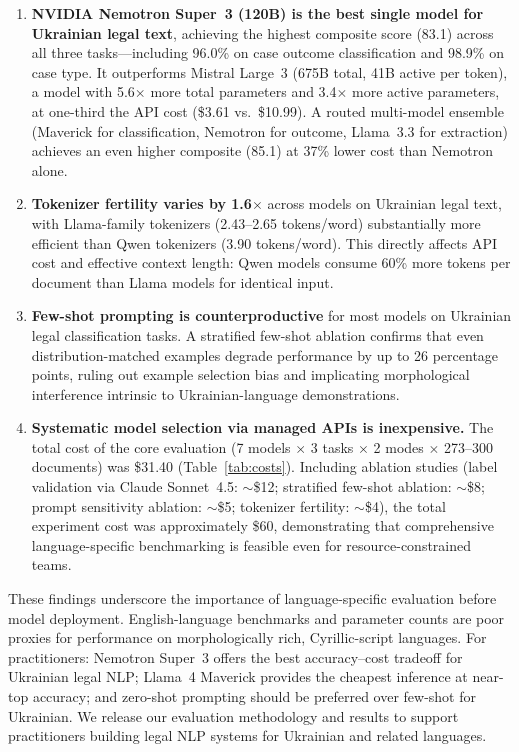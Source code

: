 \documentclass[11pt,a4paper]{article}
\begin{document}
\begin{enumerate}[leftmargin=*]
    \item \textbf{NVIDIA Nemotron Super~3 (120B) is the best single model for Ukrainian legal text}, achieving the highest composite score (83.1) across all three tasks---including 96.0\% on case outcome classification and 98.9\% on case type. It outperforms Mistral Large~3 (675B total, 41B active per token), a model with 5.6$\times$ more total parameters and 3.4$\times$ more active parameters, at one-third the API cost (\$3.61 vs.\ \$10.99). A routed multi-model ensemble (Maverick for classification, Nemotron for outcome, Llama~3.3 for extraction) achieves an even higher composite (85.1) at 37\% lower cost than Nemotron alone.

    \item \textbf{Tokenizer fertility varies by 1.6$\times$} across models on Ukrainian legal text, with Llama-family tokenizers (2.43--2.65 tokens/word) substantially more efficient than Qwen tokenizers (3.90 tokens/word). This directly affects API cost and effective context length: Qwen models consume 60\% more tokens per document than Llama models for identical input.

    \item \textbf{Few-shot prompting is counterproductive} for most models on Ukrainian legal classification tasks. A stratified few-shot ablation confirms that even distribution-matched examples degrade performance by up to 26 percentage points, ruling out example selection bias and implicating morphological interference intrinsic to Ukrainian-language demonstrations.

    \item \textbf{Systematic model selection via managed APIs is inexpensive.} The total cost of the core evaluation (7 models $\times$ 3 tasks $\times$ 2 modes $\times$ 273--300 documents) was \$31.40 (Table~\ref{tab:costs}). Including ablation studies (label validation via Claude Sonnet~4.5: ${\sim}$\$12; stratified few-shot ablation: ${\sim}$\$8; prompt sensitivity ablation: ${\sim}$\$5; tokenizer fertility: ${\sim}$\$4), the total experiment cost was approximately \$60, demonstrating that comprehensive language-specific benchmarking is feasible even for resource-constrained teams.
\end{enumerate}

These findings underscore the importance of language-specific evaluation before model deployment. English-language benchmarks and parameter counts are poor proxies for performance on morphologically rich, Cyrillic-script languages. For practitioners: Nemotron Super~3 offers the best accuracy--cost tradeoff for Ukrainian legal NLP; Llama~4 Maverick provides the cheapest inference at near-top accuracy; and zero-shot prompting should be preferred over few-shot for Ukrainian. We release our evaluation methodology and results to support practitioners building legal NLP systems for Ukrainian and related languages.
\end{document}
